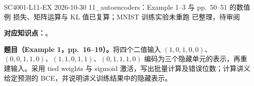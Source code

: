 

\examplemeta
  {SC4001-L11-EX}
  {2026-10-30}
  {11\_autoencoders：Example 1--3 与 pp.~50--51 的数值例}
  {损失、矩阵运算与 KL 值已复算；MNIST 训练实验未重跑}
  {已整理，待审阅}


\textbf{对应知识点：}。

\textbf{题目（Example 1，pp.~16--19）。}将四个二值输入
$(1,0,1,0,0)$、$(0,0,1,1,0)$、$(1,1,0,1,1)$、$(0,1,1,1,0)$
编码为三个隐藏单元的表示，再重建输入。采用 tied weights 与 sigmoid 激活，写出批量计算及错误位数；计算讲义给定预测的 BCE，并说明讲义训练结果中的隐藏表示。

